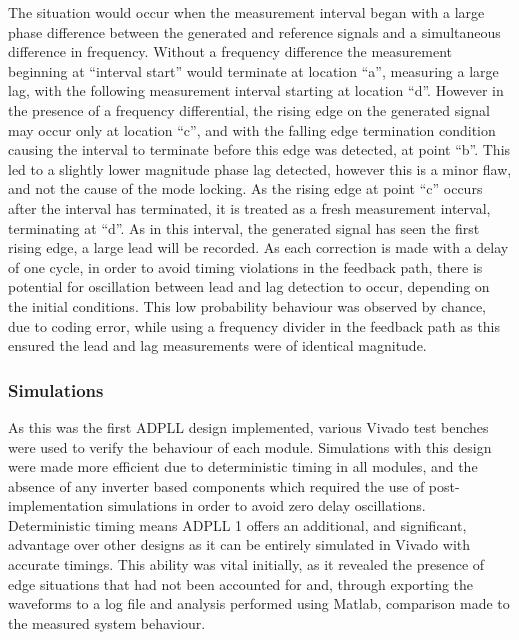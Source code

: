The situation would occur when the measurement interval began with a large phase difference between the generated and reference signals and a simultaneous difference in frequency. Without a frequency difference the measurement beginning at ``interval start'' would terminate at location ``a'', measuring a large lag, with the following measurement interval starting at location ``d''. However in the presence of a frequency differential, the rising edge on the generated signal may occur only at location ``c'', and with the falling edge termination condition causing the interval to terminate before this edge was detected, at point ``b''. This led to a slightly lower magnitude phase lag detected, however this is a minor flaw, and not the cause of the mode locking. As the rising edge at point ``c'' occurs after the interval has terminated, it is treated as a fresh measurement interval, terminating at ``d''. As in this interval, the generated signal has seen the first rising edge, a large lead will be recorded. As each correction is made with a delay of one cycle, in order to avoid timing violations in the feedback path, there is potential for oscillation between lead and lag detection to occur, depending on the initial conditions. This low probability behaviour was observed by chance, due to coding error, while using a frequency divider in the feedback path as this ensured the lead and lag measurements were of identical magnitude. 

\subsubsection{Simulations}
As this was the first \ac{ADPLL} design implemented, various Vivado test benches were used to verify the behaviour of each module. Simulations with this design were made more efficient due to deterministic timing in all modules, and the absence of any inverter based components which required the use of post-implementation simulations in order to avoid zero delay oscillations. Deterministic timing means \ac{ADPLL} 1 offers an additional, and significant, advantage over other designs as it can be entirely simulated in Vivado with accurate timings. This ability was vital initially, as it revealed the presence of edge situations that had not been accounted for and, through exporting the waveforms to a log file and analysis performed using Matlab, comparison made to the measured system behaviour.

